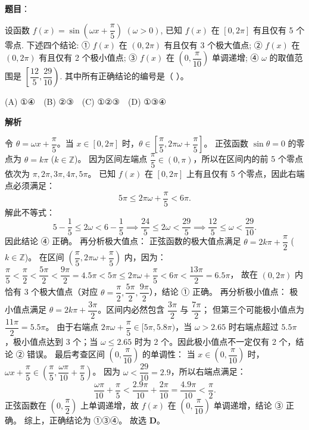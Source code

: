 \begin{answer}

\textbf{题目}：

设函数 $f(x) = \sin\left(\omega x + \dfrac{\pi}{5}\right)$ $(\omega > 0)$, 已知 $f(x)$ 在 $[0, 2\pi]$ 有且仅有 5 个零点. 下述四个结论:  
① $f(x)$ 在 $(0, 2\pi)$ 有且仅有 3 个极大值点;  
② $f(x)$ 在 $(0, 2\pi)$ 有且仅有 2 个极小值点;  
③ $f(x)$ 在 $\left(0, \dfrac{\pi}{10}\right)$ 单调递增;  
④ $\omega$ 的取值范围是 $\left[\dfrac{12}{5}, \dfrac{29}{10}\right)$.  
其中所有正确结论的编号是（ ）。

(A) ①④　(B) ②③　(C) ①②③　(D) ①③④

\textbf{解析}

令 $\theta = \omega x + \dfrac{\pi}{5}$。当 $x \in [0, 2\pi]$ 时，$\theta \in \left[\dfrac{\pi}{5}, 2\pi\omega + \dfrac{\pi}{5}\right]$。
正弦函数 $\sin\theta = 0$ 的零点为 $\theta = k\pi$ ($k \in \mathbb{Z}$)。
因为区间左端点 $\dfrac{\pi}{5} \in (0, \pi)$，所以在区间内的前 5 个零点依次为 $\pi, 2\pi, 3\pi, 4\pi, 5\pi$。
已知 $f(x)$ 在 $[0, 2\pi]$ 上有且仅有 5 个零点，因此右端点必须满足：
\nopagebreak[4]
\[5\pi \leqslant 2\pi\omega + \frac{\pi}{5} < 6\pi.\]
解此不等式：
\nopagebreak[4]
\[5 - \frac{1}{5} \leqslant 2\omega < 6 - \frac{1}{5} \implies \frac{24}{5} \leqslant 2\omega < \frac{29}{5} \implies \frac{12}{5} \leqslant \omega < \frac{29}{10}.\]
因此结论 ④ 正确。
再分析极大值点：
正弦函数的极大值点满足 $\theta = 2k\pi + \dfrac{\pi}{2}$ ($k \in \mathbb{Z}$)。
在区间 $\left(\dfrac{\pi}{5}, 2\pi\omega + \dfrac{\pi}{5}\right)$ 内，因为：
$\dfrac{\pi}{5} < \dfrac{\pi}{2} < \dfrac{5\pi}{2} < \dfrac{9\pi}{2} = 4.5\pi < 5\pi \leqslant 2\pi\omega + \dfrac{\pi}{5} < 6\pi < \dfrac{13\pi}{2} = 6.5\pi$，
故在 $(0, 2\pi)$ 内恰有 3 个极大值点（对应 $\theta = \dfrac{\pi}{2}, \dfrac{5\pi}{2}, \dfrac{9\pi}{2}$），结论 ① 正确。
再分析极小值点：
极小值点满足 $\theta = 2k\pi + \dfrac{3\pi}{2}$。区间内必然包含 $\dfrac{3\pi}{2}$ 与 $\dfrac{7\pi}{2}$；
但第三个可能极小值点为 $\dfrac{11\pi}{2} = 5.5\pi$。
由于右端点 $2\pi\omega + \dfrac{\pi}{5} \in [5\pi, 5.8\pi)$，当 $\omega > 2.65$ 时右端点超过 $5.5\pi$，极小值点达到 3 个；当 $\omega \leqslant 2.65$ 时为 2 个。因此极小值点不一定仅有 2 个，结论 ② 错误。
最后考查区间 $\left(0, \dfrac{\pi}{10}\right)$ 的单调性：
当 $x \in \left(0, \dfrac{\pi}{10}\right)$ 时，$\omega x + \dfrac{\pi}{5} \in \left(\dfrac{\pi}{5}, \dfrac{\omega\pi}{10} + \dfrac{\pi}{5}\right)$。
因为 $\omega < \dfrac{29}{10} = 2.9$，所以右端点满足：
\nopagebreak[4]
\[\frac{\omega\pi}{10} + \frac{\pi}{5} < \frac{2.9\pi}{10} + \frac{2\pi}{10} = \frac{4.9\pi}{10} < \frac{\pi}{2}.\]
正弦函数在 $\left(0, \dfrac{\pi}{2}\right)$ 上单调递增，故 $f(x)$ 在 $\left(0, \dfrac{\pi}{10}\right)$ 单调递增，结论 ③ 正确。
综上，正确结论为 ①③④。
故选 \textbf{D}。


\par\medskip

\end{answer}

